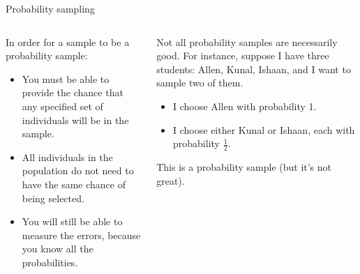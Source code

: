\documentclass[aspectratio=169]{../latex_main/tntbeamer}  %
\begin{document}
	
		\begin{frame}{Probability sampling}
	    \begin{columns}
	        \begin{column}{.4\textwidth}
	            In order for a sample to be a probability sample:
	            \begin{itemize}
	                \item You must be able to provide the chance that any specified set of individuals will be in the sample.
	               \item All individuals in the population do not need to have the same chance of being selected.
	                \item You will still be able to measure the errors, because you know all the probabilities.
	            \end{itemize}
	        \end{column}
	        
	        \begin{column}{.5\textwidth}
	            Not all probability samples are necessarily good.
	            \bigskip
	            For instance, suppose I have three students: Allen, Kunal, Ishaan, and I want to sample two of them.
	            \begin{itemize}
	                \item I choose Allen with probability 1.
	                \item I choose either Kunal or Ishaan, each with probability $\frac{1}{2}$.
	            \end{itemize}
	            This is a probability sample (but it’s not great).

	        \end{column}
	        
	    \end{columns}
	    
	\end{frame}
	
\end{document}
